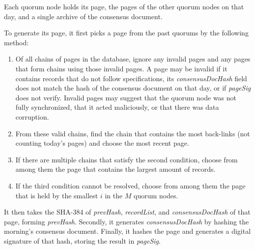 Each quorum node holds its page, the pages of the other quorum nodes on that day, and a single archive of the consensus document. 

To generate its page, it first picks a page from the past quorums by the following method:


\begin{enumerate}
	\item Of all chains of pages in the database, ignore any invalid pages and any pages that form chains using those invalid pages. A page may be invalid if it contains records that do not follow specifications, its \emph{consensusDocHash} field does not match the hash of the consensus document on that day, or if \emph{pageSig} does not verify. Invalid pages may suggest that the quorum node was not fully synchronized, that it acted maliciously, or that there was data corruption.
	\item From these valid chains, find the chain that contains the most back-links (not counting today's pages) and choose the most recent page.
	\item If there are multiple chains that satisfy the second condition, choose from among them the page that contains the largest amount of records.
	\item If the third condition cannot be resolved, choose from among them the page that is held by the smallest $ i $ in the $ M $ quorum nodes.
\end{enumerate}

It then takes the SHA-384 of \emph{prevHash}, \emph{recordList}, and \emph{consensusDocHash} of that page, forming \emph{prevHash}. Secondly, it generates \emph{consensusDocHash} by hashing the morning's consensus document. Finally, it hashes the page and generates a digital signature of that hash, storing the result in \emph{pageSig}.

